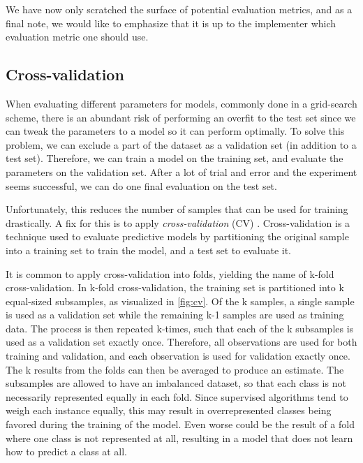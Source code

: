 We have now only scratched the surface of potential evaluation metrics, and as a final note, we would like to emphasize that it is up to the implementer which evaluation metric one should use. %


\subsection{Cross-validation}
\label{cross-validation}
When evaluating different parameters for models, commonly done in a grid-search scheme, there is an abundant risk of performing an overfit to the test set since we can tweak the parameters to a model so it can perform optimally. To solve this problem, we can exclude a part of the dataset as a validation set (in addition to a test set). Therefore, we can train a model on the training set, and evaluate the parameters on the validation set. After a lot of trial and error and the experiment seems successful, we can do one final evaluation on the test set.

Unfortunately, this reduces the number of samples that can be used for training drastically. A fix for this is to apply \textit{cross-validation} (CV) \cite{Murphy2012}. Cross-validation is a technique used to evaluate predictive models by partitioning the original sample into a training set to train the model, and a test set to evaluate it.


\noindent It is common to apply cross-validation into folds, yielding the name of k-fold cross-validation. In k-fold cross-validation, the training set is partitioned into k equal-sized subsamples, as visualized in \autoref{fig:cv}. Of the k samples, a single sample is used as a validation set while the remaining k-1 samples are used as training data. The process is then repeated k-times, such that each of the k subsamples is used as a validation set exactly once. Therefore, all observations are used for both training and validation, and each observation is used for validation exactly once. The k results from the folds can then be averaged to produce an estimate. The subsamples are allowed to have an imbalanced dataset, so that each class is not necessarily represented equally in each fold. Since supervised algorithms tend to weigh each instance equally, this may result in overrepresented classes being favored during the training of the model. Even worse could be the result of a fold where one class is not represented at all, resulting in a model that does not learn how to predict a class at all.

